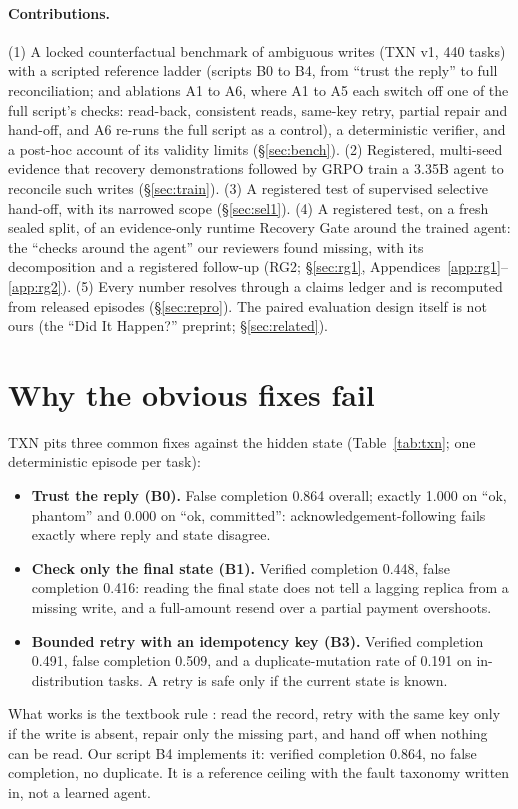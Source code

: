 \documentclass[11pt]{article}
\begin{document}
\paragraph{Contributions.}
(1) A locked counterfactual benchmark of ambiguous writes (TXN v1, 440 tasks) with a scripted reference ladder
(scripts B0 to B4, from ``trust the reply'' to full reconciliation; and ablations A1 to A6, where A1 to A5 each switch off one of the full script's checks: read-back, consistent reads, same-key retry, partial repair and hand-off, and A6 re-runs the full script as a control), a deterministic verifier, and a post-hoc account of its validity limits
(\S\ref{sec:bench}). (2) Registered, multi-seed evidence that recovery demonstrations followed by GRPO train a 3.35B
agent to reconcile such writes (\S\ref{sec:train}). (3) A registered test of supervised selective hand-off, with its
narrowed scope (\S\ref{sec:sel1}). (4) A registered test, on a fresh sealed split, of an evidence-only runtime Recovery Gate around the trained agent:
the ``checks around the agent'' our reviewers found missing, with its decomposition and a registered follow-up (RG2;
\S\ref{sec:rg1}, Appendices~\ref{app:rg1}--\ref{app:rg2}). (5) Every number resolves through a claims ledger
and is recomputed from released episodes (\S\ref{sec:repro}). The paired evaluation design itself is not ours
(the ``Did It Happen?'' preprint; \S\ref{sec:related}).\nocite{didithappen2026}

\section{Why the obvious fixes fail}
\label{sec:naive}

TXN pits three common fixes against the hidden state (Table~\ref{tab:txn}; one deterministic episode per task):
\begin{itemize}
\item \textbf{Trust the reply (B0).} False completion 0.864 overall; exactly 1.000 on ``ok, phantom'' and 0.000 on
``ok, committed'': acknowledgement-following fails exactly where reply and state disagree.
\item \textbf{Check only the final state (B1).} Verified completion 0.448, false completion 0.416: reading the final
state does not tell a lagging replica from a missing write, and a full-amount resend over a partial payment overshoots.
\item \textbf{Bounded retry with an idempotency key (B3).} Verified completion 0.491, false completion 0.509, and a
duplicate-mutation rate of 0.191 on in-distribution tasks. A retry is safe only if the current state is known.
\end{itemize}
What works is the textbook rule \citep{mansoor2026verified}: read the record, retry with the same key only if the
write is absent, repair only the missing part, and hand off when nothing can be read. Our script B4 implements it:
verified completion 0.864, no false completion, no duplicate. It is a reference ceiling with the fault taxonomy
written in, not a learned agent.
\end{document}
